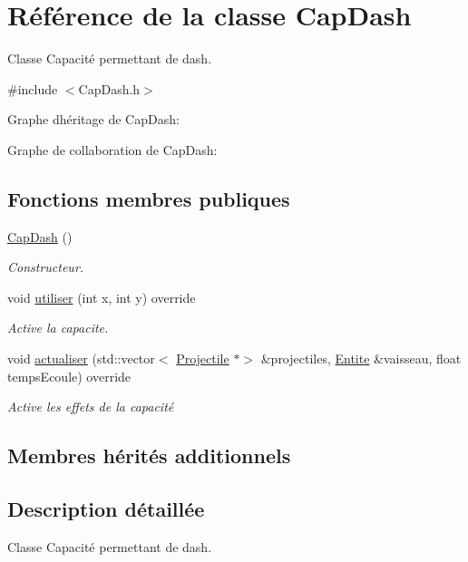 \hypertarget{class_cap_dash}{}\section{Référence de la classe Cap\+Dash}
\label{class_cap_dash}


Classe Capacité permettant de dash.  




{\ttfamily \#include $<$Cap\+Dash.\+h$>$}



Graphe d\textquotesingle{}héritage de Cap\+Dash\+:


Graphe de collaboration de Cap\+Dash\+:
\subsection*{Fonctions membres publiques}
\begin{DoxyCompactItemize}
\item 
\hyperlink{class_cap_dash_ac38287e31284b6b5ac8add730830bfed}{Cap\+Dash} ()
\begin{DoxyCompactList}\small\item\em Constructeur. \end{DoxyCompactList}\item 
void \hyperlink{class_cap_dash_a8a0fe26c8b13d8a9f6cf5a95d6559f3d}{utiliser} (int x, int y) override
\begin{DoxyCompactList}\small\item\em Active la capacite. \end{DoxyCompactList}\item 
void \hyperlink{class_cap_dash_a23e3009b85288e7aadce2eb2b581fac0}{actualiser} (std\+::vector$<$ \hyperlink{class_projectile}{Projectile} $\ast$$>$ \&projectiles, \hyperlink{class_entite}{Entite} \&vaisseau, float temps\+Ecoule) override
\begin{DoxyCompactList}\small\item\em Active les effets de la capacité \end{DoxyCompactList}\end{DoxyCompactItemize}
\subsection*{Membres hérités additionnels}


\subsection{Description détaillée}
Classe Capacité permettant de dash. 

